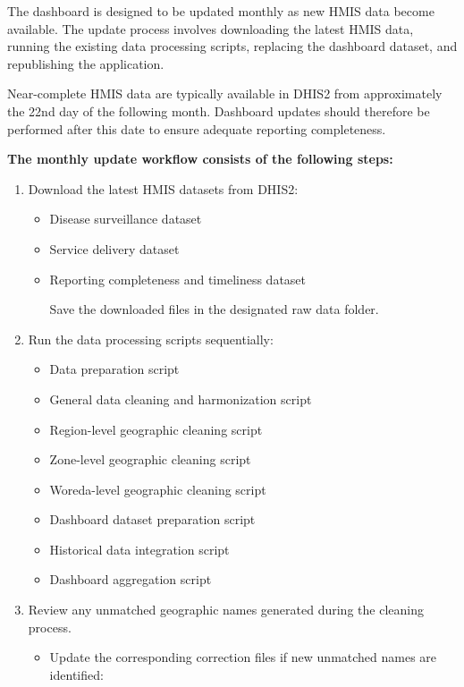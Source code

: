 \documentclass[
  letterpaper,
  DIV=11,
  numbers=noendperiod]{scrartcl}
\providecommand{\tightlist}{%
  \setlength{\itemsep}{0pt}\setlength{\parskip}{0pt}}
\begin{document}
The dashboard is designed to be updated monthly as new HMIS data become
available. The update process involves downloading the latest HMIS data,
running the existing data processing scripts, replacing the dashboard
dataset, and republishing the application.

Near-complete HMIS data are typically available in DHIS2 from
approximately the 22nd day of the following month. Dashboard updates
should therefore be performed after this date to ensure adequate
reporting completeness.

\textbf{The monthly update workflow consists of the following steps:}

\begin{enumerate}
\def\labelenumi{\arabic{enumi}.}
\tightlist
\item
  Download the latest HMIS datasets from DHIS2:

  \begin{itemize}
  \item
    Disease surveillance dataset
  \item
    Service delivery dataset
  \item
    Reporting completeness and timeliness dataset

    Save the downloaded files in the designated raw data folder.
  \end{itemize}
\item
  Run the data processing scripts sequentially:

  \begin{itemize}
  \item
    Data preparation script
  \item
    General data cleaning and harmonization script
  \item
    Region-level geographic cleaning script
  \item
    Zone-level geographic cleaning script
  \item
    Woreda-level geographic cleaning script
  \item
    Dashboard dataset preparation script
  \item
    Historical data integration script
  \item
    Dashboard aggregation script
  \end{itemize}
\item
  Review any unmatched geographic names generated during the cleaning
  process.

  \begin{itemize}
  \item
    Update the corresponding correction files if new unmatched names are
    identified:


\end{itemize}
\end{enumerate}
\end{document}
